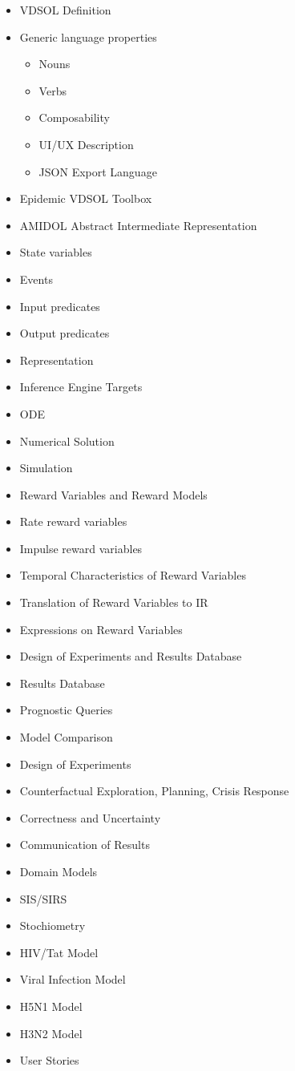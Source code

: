 \begin{itemize}
\tightlist
\item
  VDSOL Definition
\item
  Generic language properties

  \begin{itemize}
  \tightlist
  \item
    Nouns
  \item
    Verbs
  \item
    Composability
  \item
    UI/UX Description
  \item
    JSON Export Language
  \end{itemize}
\item
  Epidemic VDSOL Toolbox
\item
  AMIDOL Abstract Intermediate Representation
\item
  State variables
\item
  Events
\item
  Input predicates
\item
  Output predicates
\item
  Representation
\item
  Inference Engine Targets
\item
  ODE
\item
  Numerical Solution
\item
  Simulation
\item
  Reward Variables and Reward Models
\item
  Rate reward variables
\item
  Impulse reward variables
\item
  Temporal Characteristics of Reward Variables
\item
  Translation of Reward Variables to IR
\item
  Expressions on Reward Variables
\item
  Design of Experiments and Results Database
\item
  Results Database
\item
  Prognostic Queries
\item
  Model Comparison
\item
  Design of Experiments
\item
  Counterfactual Exploration, Planning, Crisis Response
\item
  Correctness and Uncertainty
\item
  Communication of Results
\item
  Domain Models
\item
  SIS/SIRS
\item
  Stochiometry
\item
  HIV/Tat Model
\item
  Viral Infection Model
\item
  H5N1 Model
\item
  H3N2 Model
\item
  User Stories
\end{itemize}
